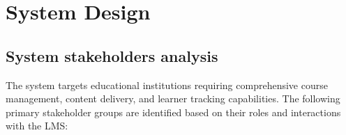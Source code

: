 \chapter{System Design}

\section{System stakeholders analysis}

The system targets educational institutions requiring comprehensive course management, 
content delivery, and learner tracking capabilities. The following primary stakeholder 
groups are identified based on their roles and interactions with the LMS:

